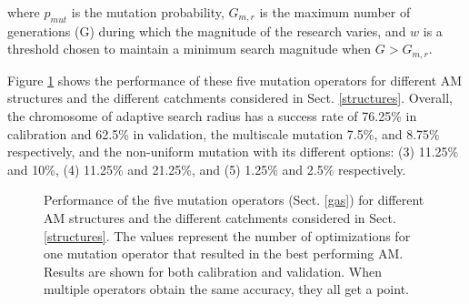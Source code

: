 \documentclass[draft]{agujournal2019}
\begin{document}
where $p_{mut}$ is the mutation probability, $G_{m,r}$ is the maximum number of generations (G) during which the magnitude of the research varies, and $w$ is a threshold chosen to maintain a minimum search magnitude when $G>G_{m,r}$.

Figure \ref{fig_mutation_operators_perfs} shows the performance of these five mutation operators for different AM structures and the different catchments considered in Sect. \ref{structures}. Overall, the chromosome of adaptive search radius has a success rate of 76.25\% in calibration and 62.5\% in validation, the multiscale mutation 7.5\%, and 8.75\% respectively, and the non-uniform mutation with its different options: (3) 11.25\% and 10\%, (4) 11.25\% and 21.25\%, and (5) 1.25\% and 2.5\% respectively.

\begin{figure}[hbt]
	\noindent{}
	\caption{Performance of the five mutation operators (Sect. \ref{gas}) for different AM structures and the different catchments considered in Sect. \ref{structures}. The values represent the number of optimizations for one mutation operator that resulted in the best performing AM. Results are shown for both calibration and validation. When multiple operators obtain the same accuracy, they all get a point.}
	\label{fig_mutation_operators_perfs}
\end{figure}
\end{document}
